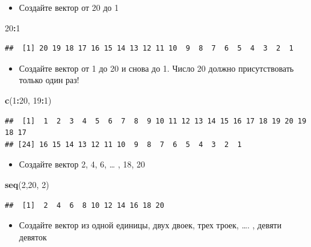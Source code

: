 \documentclass[]{book}
\newenvironment{Shaded}{\begin{snugshade}}{\end{snugshade}}
\newcommand{\DecValTok}[1]{\textcolor[rgb]{0.00,0.00,0.81}{#1}}
\newcommand{\KeywordTok}[1]{\textcolor[rgb]{0.13,0.29,0.53}{\textbf{#1}}}
\newcommand{\NormalTok}[1]{#1}
\newcommand{\OperatorTok}[1]{\textcolor[rgb]{0.81,0.36,0.00}{\textbf{#1}}}
\providecommand{\tightlist}{%
  \setlength{\itemsep}{0pt}\setlength{\parskip}{0pt}}
\begin{document}
\begin{itemize}
\tightlist
\item
  Создайте вектор от 20 до 1
\end{itemize}

\begin{Shaded}
\begin{Highlighting}[]
\DecValTok{20}\OperatorTok{:}\DecValTok{1}
\end{Highlighting}
\end{Shaded}

\begin{verbatim}
##  [1] 20 19 18 17 16 15 14 13 12 11 10  9  8  7  6  5  4  3  2  1
\end{verbatim}

\begin{itemize}
\tightlist
\item
  Создайте вектор от 1 до 20 и снова до 1. Число 20 должно присутствовать только один раз!
\end{itemize}

\begin{Shaded}
\begin{Highlighting}[]
\KeywordTok{c}\NormalTok{(}\DecValTok{1}\OperatorTok{:}\DecValTok{20}\NormalTok{, }\DecValTok{19}\OperatorTok{:}\DecValTok{1}\NormalTok{)}
\end{Highlighting}
\end{Shaded}

\begin{verbatim}
##  [1]  1  2  3  4  5  6  7  8  9 10 11 12 13 14 15 16 17 18 19 20 19 18 17
## [24] 16 15 14 13 12 11 10  9  8  7  6  5  4  3  2  1
\end{verbatim}

\begin{itemize}
\tightlist
\item
  Создайте вектор 2, 4, 6, \ldots{} , 18, 20
\end{itemize}

\begin{Shaded}
\begin{Highlighting}[]
\KeywordTok{seq}\NormalTok{(}\DecValTok{2}\NormalTok{,}\DecValTok{20}\NormalTok{, }\DecValTok{2}\NormalTok{)}
\end{Highlighting}
\end{Shaded}

\begin{verbatim}
##  [1]  2  4  6  8 10 12 14 16 18 20
\end{verbatim}

\begin{itemize}
\tightlist
\item
  Создайте вектор из одной единицы, двух двоек, трех троек, \ldots. , девяти девяток
\end{itemize}
\end{document}
